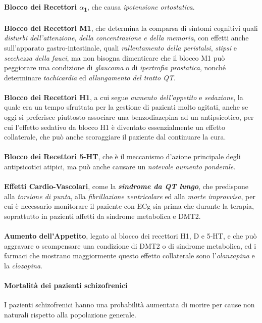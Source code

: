 \textbf{Blocco dei Recettori $\alpha$\textsubscript{1}}, che causa
\emph{ipotensione ortostatica}.
\\\\
\textbf{Blocco dei Recettori M1}, che determina la comparsa di sintomi
cognitivi quali \emph{disturbi dell'attenzione}, \emph{della
concentrazione e della memoria}, con effetti anche sull'apparato
gastro-intestinale, quali \emph{rallentamento della peristalsi},
\emph{stipsi} e \emph{secchezza della fauci}, ma non bisogna dimenticare
che il blocco M1 può peggiorare una condizione di \emph{glaucoma} o di
\emph{ipertrofia prostatica}, nonché determinare \emph{tachicardia} ed
\emph{allungamento del tratto QT}.
\\\\
\textbf{Blocco dei Recettori H1}, a cui segue \emph{aumento
dell'appetito} e \emph{sedazione}, la quale era un tempo sfruttata per
la gestione di pazienti molto agitati, anche se oggi si preferisce
piuttosto associare una benzodiazepina ad un antipsicotico, per cui
l'effetto sedativo da blocco H1 è diventato essenzialmente un effetto
collaterale, che può anche scoraggiare il paziente dal continuare la
cura.
\\\\
\textbf{Blocco dei Recettori 5-HT}, che è il meccanismo d'azione
principale degli antipsicotici atipici, ma può anche causare un
\emph{notevole aumento ponderale}.
\\\\
\textbf{Effetti Cardio-Vascolari}, come la \textbf{\emph{sindrome da QT
lungo}}, che predispone alla \emph{torsione di punta}, alla
\emph{fibrillazione ventricolare} ed alla \emph{morte improvvisa}, per
cui è necessario monitorare il paziente con ECg sia prima che durante la
terapia, soprattutto in pazienti affetti da sindrome metabolica e DMT2.
\\\\
\textbf{Aumento dell'Appetito}, legato al blocco dei recettori H1, D e
5-HT, e che può aggravare o scompensare una condizione di DMT2 o di
sindrome metabolica, ed i farmaci che mostrano maggiormente questo
effetto collaterale sono l'\emph{olanzapina} e la \emph{clozapina}.

\paragraph{Mortalità dei pazienti schizofrenici}

I pazienti schizofrenici hanno una probabilità aumentata di morire per
cause non naturali rispetto alla popolazione generale.

